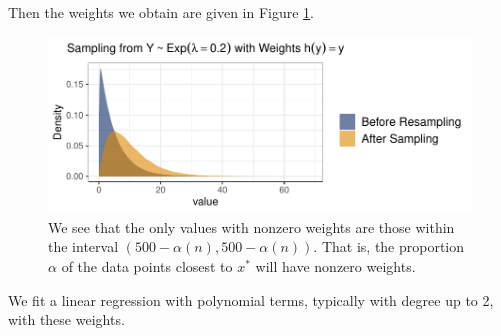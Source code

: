 \documentclass[12pt,twoside]{smiththesis}
\begin{document}
Then the weights we obtain are given in Figure \ref{fig:weights}.
\begin{figure}
\centering
\includegraphics{thesis_files/figure-latex/unnamed-chunk-23-1.pdf}
\caption{\label{fig:unnamed-chunk-23}\label{fig:weights} We see that the only values with nonzero weights are those within the interval \((500 - \alpha (n), 500 - \alpha (n))\). That is, the proportion \(\alpha\) of the data points closest to \(x^*\) will have nonzero weights.}
\end{figure}
We fit a linear regression with polynomial terms, typically with degree up to 2, with these weights.
\end{document}
